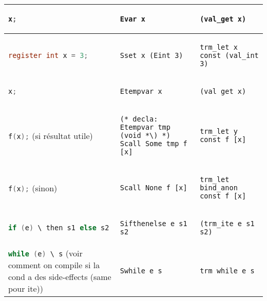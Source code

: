 \documentclass[class=scrartcl,border={0cm 1.5cm 1cm -0.5cm},multi={tabular}]{standalone}
\theoremstyle{break}
\newcommand{\clst}[1]{\lstinline[language=C]!#1!}
\begin{document}
\begin{tabular}{p{6cm}p{10cm}p{10cm}}
  \clst{x;} &
\begin{lstlisting}
Evar x
\end{lstlisting} &
\begin{lstlisting}
(val_get x)
\end{lstlisting} \\
  \midrule
  \clst{register int x = 3;} &
\begin{lstlisting}
Sset x (Eint 3)
\end{lstlisting} &
\begin{lstlisting}
trm_let x const (val_int 3)
\end{lstlisting} \\
\clst{x;} &
\begin{lstlisting}
Etempvar x
\end{lstlisting} &
\begin{lstlisting}
(val_get x)
\end{lstlisting} \\
  \midrule
\clst{f(x);} (si résultat utile) &
\begin{lstlisting}
(* decla: Etempvar tmp (void *\) *)
Scall Some tmp f [x]
\end{lstlisting} &
\begin{lstlisting}
trm_let y const f [x]
\end{lstlisting} \\
  \midrule
\clst{f(x);} (sinon) &
\begin{lstlisting}
Scall None f [x]
\end{lstlisting} &
\begin{lstlisting}
trm_let bind_anon const f [x]
\end{lstlisting} \\
  \midrule
\clst{if (e) \ then s1 else s2} &
\begin{lstlisting}
Sifthenelse e s1 s2
\end{lstlisting} &
\begin{lstlisting}
(trm_ite e s1 s2)
\end{lstlisting} \\
  \midrule
\clst{while (e) \ s} (voir comment on compile si la cond a des
  side-effects (same pour ite)) &
\begin{lstlisting}
Swhile e s
\end{lstlisting} &
\begin{lstlisting}
trm_while e s
\end{lstlisting} \\
  \bottomrule
\end{tabular}
\end{document}
